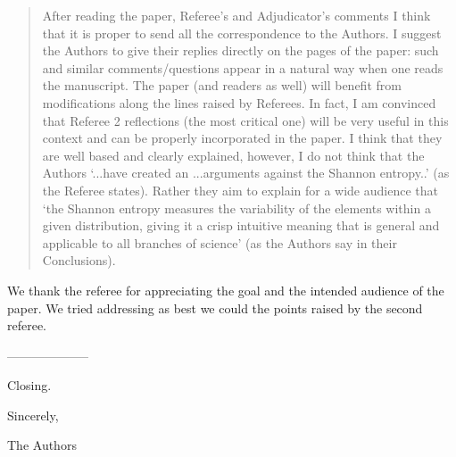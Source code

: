 \documentclass[11pt]{article}
\begin{document}
\begin{quote}
After reading the paper, Referee’s and Adjudicator’s comments I think that it is proper to send all the correspondence to the Authors. I suggest the Authors to give their replies directly on the pages of the paper: such and similar comments/questions appear in a natural way when one reads the manuscript. The paper (and readers as well) will benefit from modifications along the lines raised by Referees. In fact, I am convinced that  Referee 2 reflections  (the most critical one) will be very useful in this context and can be properly incorporated in the paper. I think that they are well based and clearly explained, however, I do not think that the Authors ‘...have created an ...arguments against the Shannon entropy..’ (as the Referee states). Rather they aim to explain for a wide audience that ‘the Shannon entropy measures the variability of the elements within a given distribution, giving it a crisp intuitive meaning that is general and applicable to all branches of science’ (as the Authors say in their Conclusions).
\end{quote}

We thank the referee for appreciating the goal and the intended audience of the paper. We tried addressing as best we could the points raised by the second referee.


--------------------


Closing.

Sincerely,

The Authors
\end{document}
